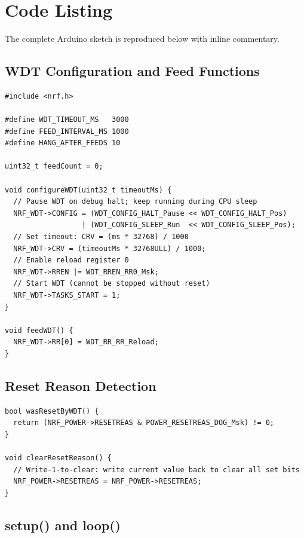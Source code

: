\documentclass[12pt, a4paper]{article}
\begin{document}
\section{Code Listing}

The complete Arduino sketch is reproduced below with inline commentary.

\subsection{WDT Configuration and Feed Functions}

\begin{lstlisting}[caption={WDT configuration (\texttt{configureWDT}) and feed
  (\texttt{feedWDT}) functions.}]
#include <nrf.h>

#define WDT_TIMEOUT_MS   3000
#define FEED_INTERVAL_MS 1000
#define HANG_AFTER_FEEDS 10

uint32_t feedCount = 0;

void configureWDT(uint32_t timeoutMs) {
  // Pause WDT on debug halt; keep running during CPU sleep
  NRF_WDT->CONFIG = (WDT_CONFIG_HALT_Pause << WDT_CONFIG_HALT_Pos)
                  | (WDT_CONFIG_SLEEP_Run  << WDT_CONFIG_SLEEP_Pos);
  // Set timeout: CRV = (ms * 32768) / 1000
  NRF_WDT->CRV = (timeoutMs * 32768ULL) / 1000;
  // Enable reload register 0
  NRF_WDT->RREN |= WDT_RREN_RR0_Msk;
  // Start WDT (cannot be stopped without reset)
  NRF_WDT->TASKS_START = 1;
}

void feedWDT() {
  NRF_WDT->RR[0] = WDT_RR_RR_Reload;
}
\end{lstlisting}

\subsection{Reset Reason Detection}

\begin{lstlisting}[caption={Reading and clearing the \texttt{RESETREAS}
  register.}]
bool wasResetByWDT() {
  return (NRF_POWER->RESETREAS & POWER_RESETREAS_DOG_Msk) != 0;
}

void clearResetReason() {
  // Write-1-to-clear: write current value back to clear all set bits
  NRF_POWER->RESETREAS = NRF_POWER->RESETREAS;
}
\end{lstlisting}

\subsection{setup() and loop()}
\end{document}
